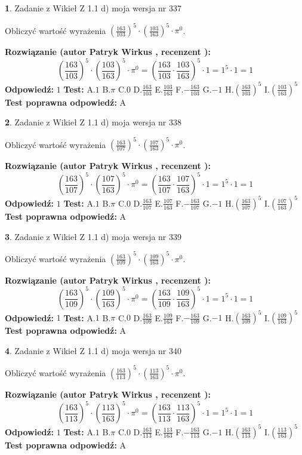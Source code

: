 \documentclass[12pt, a4paper]{article}
\theoremstyle{definition} %
\newtheorem{zad}{}
\newcommand{\zadStart}[1]{\begin{zad}#1\newline}
\newcommand{\zadStop}{\end{zad}}
\newcommand{\rozwStart}[2]{\noindent \textbf{Rozwiązanie (autor #1 , recenzent #2): }\newline}
\newcommand{\rozwStop}{\newline}
\newcommand{\odpStart}{\noindent \textbf{Odpowiedź:}\newline}
\newcommand{\odpStop}{\newline}
\newcommand{\testStart}{\noindent \textbf{Test:}\newline}
\newcommand{\testStop}{\newline}
\newcommand{\kluczStart}{\noindent \textbf{Test poprawna odpowiedź:}\newline}
\newcommand{\kluczStop}{\newline}
\begin{document}
\zadStart{Zadanie z Wikieł Z 1.1 d) moja wersja nr 337}

Obliczyć wartość wyrażenia $(\frac{163}{103})^{5} \cdot (\frac{103}{163})^{5} \cdot \pi^{0}$.
\zadStop
\rozwStart{Patryk Wirkus}{}
$$(\frac{163}{103})^{5} \cdot (\frac{103}{163})^{5} \cdot \pi^{0} = (\frac{163}{103} \cdot \frac{103}{163})^{5} \cdot 1 = 1^{5} \cdot 1 = 1$$
\rozwStop
\odpStart
$1$
\odpStop
\testStart
A.$1$ B.$\pi$ C.$0$ D.$\frac{163}{103}$ E.$\frac{103}{163}$
F.$-\frac{163}{103}$ G.$-1$
H.$(\frac{163}{103})^{5}$
I.$(\frac{103}{163})^{5}$
\testStop
\kluczStart
A
\kluczStop



\zadStart{Zadanie z Wikieł Z 1.1 d) moja wersja nr 338}

Obliczyć wartość wyrażenia $(\frac{163}{107})^{5} \cdot (\frac{107}{163})^{5} \cdot \pi^{0}$.
\zadStop
\rozwStart{Patryk Wirkus}{}
$$(\frac{163}{107})^{5} \cdot (\frac{107}{163})^{5} \cdot \pi^{0} = (\frac{163}{107} \cdot \frac{107}{163})^{5} \cdot 1 = 1^{5} \cdot 1 = 1$$
\rozwStop
\odpStart
$1$
\odpStop
\testStart
A.$1$ B.$\pi$ C.$0$ D.$\frac{163}{107}$ E.$\frac{107}{163}$
F.$-\frac{163}{107}$ G.$-1$
H.$(\frac{163}{107})^{5}$
I.$(\frac{107}{163})^{5}$
\testStop
\kluczStart
A
\kluczStop



\zadStart{Zadanie z Wikieł Z 1.1 d) moja wersja nr 339}

Obliczyć wartość wyrażenia $(\frac{163}{109})^{5} \cdot (\frac{109}{163})^{5} \cdot \pi^{0}$.
\zadStop
\rozwStart{Patryk Wirkus}{}
$$(\frac{163}{109})^{5} \cdot (\frac{109}{163})^{5} \cdot \pi^{0} = (\frac{163}{109} \cdot \frac{109}{163})^{5} \cdot 1 = 1^{5} \cdot 1 = 1$$
\rozwStop
\odpStart
$1$
\odpStop
\testStart
A.$1$ B.$\pi$ C.$0$ D.$\frac{163}{109}$ E.$\frac{109}{163}$
F.$-\frac{163}{109}$ G.$-1$
H.$(\frac{163}{109})^{5}$
I.$(\frac{109}{163})^{5}$
\testStop
\kluczStart
A
\kluczStop



\zadStart{Zadanie z Wikieł Z 1.1 d) moja wersja nr 340}

Obliczyć wartość wyrażenia $(\frac{163}{113})^{5} \cdot (\frac{113}{163})^{5} \cdot \pi^{0}$.
\zadStop
\rozwStart{Patryk Wirkus}{}
$$(\frac{163}{113})^{5} \cdot (\frac{113}{163})^{5} \cdot \pi^{0} = (\frac{163}{113} \cdot \frac{113}{163})^{5} \cdot 1 = 1^{5} \cdot 1 = 1$$
\rozwStop
\odpStart
$1$
\odpStop
\testStart
A.$1$ B.$\pi$ C.$0$ D.$\frac{163}{113}$ E.$\frac{113}{163}$
F.$-\frac{163}{113}$ G.$-1$
H.$(\frac{163}{113})^{5}$
I.$(\frac{113}{163})^{5}$
\testStop
\kluczStart
A
\kluczStop
\end{document}
